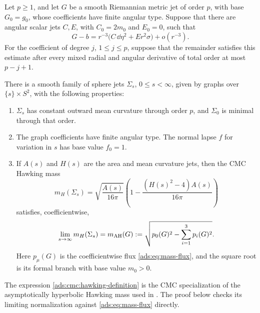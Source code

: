 \begin{proposition}\label{ads:prop:cmc-jets}
Let \(p\geq1\), and let \(G\) be a smooth Riemannian metric jet of order
\(p\), with base \(G_0=g_0\), whose coefficients have finite angular type.
Suppose that there are angular scalar jets \(C,E\), with
\(C_0=2m_0\) and \(E_0=0\), such that
\begin{equation}\label{ads:cmc:metric-asymptotics}
 G-b=r^{-3}\bigl(C\,\dd\eta^2+E r^2\sigma\bigr)+o(r^{-3}).
\end{equation}
For the coefficient of degree \(j\), \(1\leq j\leq p\), suppose that
the remainder satisfies this estimate after every mixed radial and
angular derivative of total order at most \(p-j+1\).

There is a smooth family of sphere jets
\(\Sigma_s\), \(0\leq s<\infty\), given by graphs over
\(\{s\}\times S^2\), with the following properties:
\begin{enumerate}
 \item \(\Sigma_s\) has constant outward mean curvature through order
 \(p\), and \(\Sigma_0\) is minimal through that order.
 \item The graph coefficients have finite angular type.  The normal
 lapse \(f\) for variation in \(s\) has base value \(f_0=1\).
 \item If \(A(s)\) and \(H(s)\) are the area and mean curvature jets,
 then the CMC Hawking mass
 \begin{equation}\label{ads:cmc:hawking-definition}
 m_H(\Sigma_s)=
 \sqrt{\frac{A(s)}{16\pi}}
 \left(1-\frac{(H(s)^2-4)A(s)}{16\pi}\right)
 \end{equation}
 satisfies, coefficientwise,
 \begin{equation}\label{ads:cmc:hawking-limit}
 \lim_{s\to\infty}m_H(\Sigma_s)
 =m_{\mathrm{AH}}(G)
 :=\sqrt{p_0(G)^2-\sum_{i=1}^3p_i(G)^2}.
 \end{equation}
 Here \(p_\mu(G)\) is the coefficientwise flux \eqref{ads:eq:mass-flux},
 and the square root is its formal branch with base value
 \(m_0>0\).
\end{enumerate}
\end{proposition}

The expression \eqref{ads:cmc:hawking-definition} is the CMC specialization
of the asymptotically hyperbolic Hawking mass used in
\cite[Equation~(2)]{Ambrozio2015}.  The proof below checks its limiting
normalization against \eqref{ads:eq:mass-flux} directly.

